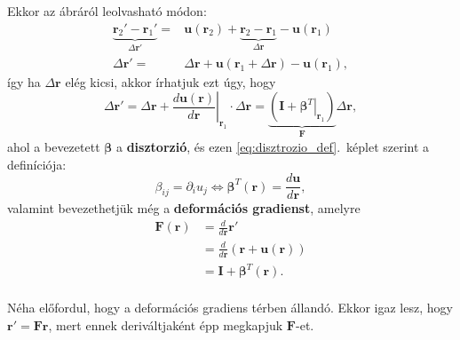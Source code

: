 \documentclass[12pt,a4paper]{scrartcl}
\let\mathbf\bm
\begin{document}
Ekkor az ábráról leolvasható módon:
\begin{align} \label{eq:kul_vektor}
  \underbrace {{{\mathbf{r}}_2}' - {{\mathbf{r}}_1}'}_{\Delta {\mathbf{r}}'} =  & {\mathbf{u}}\left( {{{\mathbf{r}}_2}} \right) + \underbrace {{{\mathbf{r}}_2} - {{\mathbf{r}}_1}}_{\Delta {\mathbf{r}}} - {\mathbf{u}}\left( {{{\mathbf{r}}_1}} \right) \nonumber \\ 
  \Delta {\mathbf{r}}' =  & \Delta {\mathbf{r}} + {\mathbf{u}}\left( {{{\mathbf{r}}_1} + \Delta {\mathbf{r}}} \right) - {\mathbf{u}}\left( {{{\mathbf{r}}_1}} \right),
\end{align}
így ha ${\Delta {\mathbf{r}}}$ elég kicsi, akkor írhatjuk ezt úgy, hogy 
\begin{equation} \label{eq:disztrozio_def}
\Delta {\mathbf{r}}' = \Delta {\mathbf{r}} + {\left. {\frac{{d{\mathbf{u}}\left( {\mathbf{r}} \right)}}{{d{\mathbf{r}}}}} \right|_{{{\mathbf{r}}_1}}} \cdot \Delta {\mathbf{r}} = \underbrace {\left( {{\mathbf{I}} + {{\left. {{{\mathbf{\beta }}^T}} \right|}_{{{\mathbf{r}}_1}}}} \right)}_{\mathbf{F}}\Delta {\mathbf{r}},
\end{equation}
ahol a bevezetett ${\mathbf{\beta }}$ a \textbf{disztorzió}, és ezen \eqref{eq:disztrozio_def}.\ képlet szerint a definíciója:
\begin{equation} \label{eq:disztrozio_szamolas}
{\beta _{ij}} = {\partial _i}{u_j} \Leftrightarrow {{\mathbf{\beta }}^T}\left( {\mathbf{r}} \right) = \frac{{d{\mathbf{u}}}}{{d{\mathbf{r}}}},
\end{equation}
valamint bevezethetjük még a \textbf{deformációs gradienst}, amelyre
\[\begin{aligned}
  {\mathbf{F}}\left( {\mathbf{r}} \right) &  = \frac{d}{{d{\mathbf{r}}}}{\mathbf{r}}' \\ 
   &  = \frac{d}{{d{\mathbf{r}}}}\left( {{\mathbf{r}} + {\mathbf{u}}\left( {\mathbf{r}} \right)} \right) \\ 
   &  = {\mathbf{I}} + {{\mathbf{\beta }}^T}\left( {\mathbf{r}} \right). \\ 
\end{aligned} \]

Néha előfordul, hogy a deformációs gradiens térben állandó. Ekkor igaz lesz, hogy ${\mathbf{r}}' = {\mathbf{Fr}}$, mert ennek deriváltjaként épp megkapjuk ${\mathbf{F}}$-et.
\end{document}
